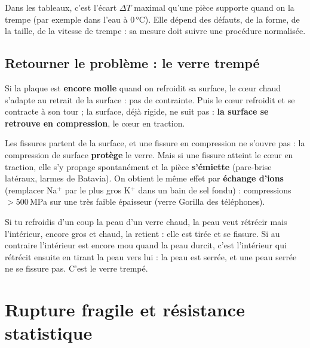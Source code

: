 \begin{warnbox}[title={La \og résistance au choc thermique\fg{} n'est pas une propriété du matériau}]
Dans les tableaux, c'est l'écart $\Delta T$ maximal qu'une pièce supporte quand on la trempe
(par exemple dans l'eau à 0\,°C). Elle dépend des défauts, de la forme, de la taille, de la vitesse
de trempe : sa mesure doit suivre une procédure normalisée.
\end{warnbox}

\subsection*{Retourner le problème : le verre trempé}


Si la plaque est \textbf{encore molle} quand on refroidit sa surface, le c\oe ur chaud
s'adapte au retrait de la surface : pas de contrainte. Puis le c\oe ur refroidit et se
contracte à son tour ; la surface, déjà rigide, ne suit pas : \textbf{la surface se retrouve en
compression}, le c\oe ur en traction.

\begin{propbox}[title=Le principe de la trempe du verre]
Les fissures partent de la surface, et une fissure en compression ne s'ouvre pas : la
compression de surface \textbf{protège} le verre. Mais si une fissure atteint le c\oe ur en
traction, elle s'y propage spontanément et la pièce \textbf{s'émiette} (pare-brise latéraux,
larmes de Batavia). On obtient le même effet par \textbf{échange d'ions} (remplacer Na$^+$ par
le plus gros K$^+$ dans un bain de sel fondu) : compressions $> 500$\,MPa sur une très faible
épaisseur (verre \og Gorilla\fg{} des téléphones).
\end{propbox}

\begin{goatbox}
Si tu refroidis d'un coup la peau d'un verre chaud, la peau veut rétrécir mais l'intérieur, encore
gros et chaud, la retient : elle est tirée et se fissure. Si au contraire l'intérieur est encore
mou quand la peau durcit, c'est l'intérieur qui rétrécit ensuite en tirant la peau vers lui : la
peau est serrée, et une peau serrée ne se fissure pas. C'est le verre trempé.
\end{goatbox}

\section{Rupture fragile et résistance statistique}


